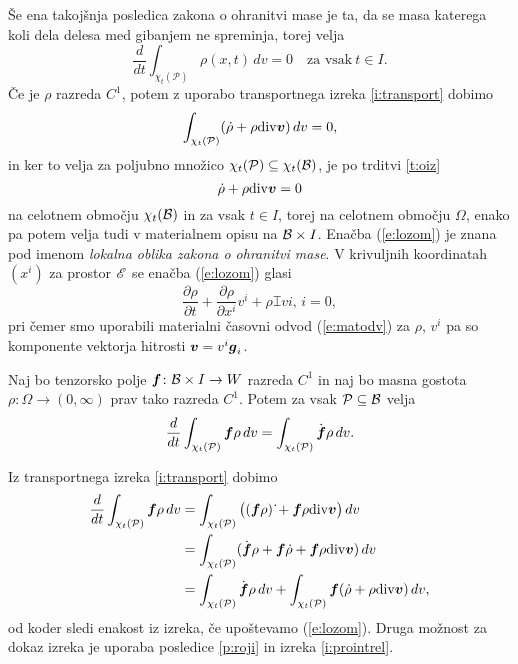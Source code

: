 Še ena takojšnja posledica zakona o ohranitvi mase je ta, da se masa katerega koli
dela delesa med gibanjem ne spreminja, torej velja
\[ \frac{d}{dt}\int_{\chi_t(\mathcal{P})}\rho(x,t)\,dv = 0\quad\textrm{za vsak}\ t\in I. \]
Če je $\rho$ razreda $C^1$, potem z uporabo transportnega izreka \ref{i:transport}
dobimo
\[ \int_{\chi_t(\mathcal{P})}(\dot{\rho}+\rho\mathrm{div}\boldsymbol v)\,dv=0, \]
in ker to velja za poljubno množico $\chi_t(\mathcal{P})\subseteq\chi_t(\mathcal B)$, je po trditvi \ref{t:oiz}
\begin{equation} \label{e:lozom}
	\dot{\rho}+\rho\mathrm{div}\boldsymbol v=0
\end{equation}
na celotnem območju $\chi_t(\mathcal B)$ in za vsak $t\in I$, torej na celotnem območju $\Omega$,
enako pa potem velja tudi v materialnem opisu na $\mathcal B\times I$.
Enačba (\ref{e:lozom}) je znana pod imenom \emph{lokalna oblika zakona o ohranitvi mase}.
V krivuljnih koordinatah $(x^i)$ za prostor $\mathscr E$ se enačba (\ref{e:lozom}) glasi
\[
	\frac{\partial\rho}{\partial t}+\frac{\partial\rho}{\partial x^i}v^i+\rho\topbot{v}{i}{,\, i}=0,
\]
pri čemer smo uporabili materialni časovni odvod (\ref{e:matodv}) za $\rho$, $v^i$ pa so
komponente vektorja hitrosti $\boldsymbol v=v^i\boldsymbol g_i$.

\begin{izrek}
	Naj bo tenzorsko polje $\boldsymbol f\colon \mathcal B\times I\to W$ razreda $C^1$ in naj bo masna gostota
	$\rho\colon\Omega\to(0,\infty)$ prav tako razreda $C^1$.
	Potem za vsak $\mathcal{P}\subseteq\mathcal B$ velja
	\[
		\frac{d}{dt}\int_{\chi_t(\mathcal{P})}\boldsymbol f\rho\,dv=
		\int_{\chi_t(\mathcal{P})}\dot{\boldsymbol f}\rho\,dv.
	\]
\end{izrek}
\proof
	Iz transportnega izreka \ref{i:transport} dobimo
	\begin{align*}
		\frac{d}{dt}\int_{\chi_t(\mathcal{P})}\boldsymbol f\rho\,dv
		&= \int_{\chi_t(\mathcal{P})}\big((\boldsymbol f\rho)\,\dot{}+\boldsymbol f\rho\mathrm{div}\boldsymbol v\big)\,dv \\
		&= \int_{\chi_t(\mathcal{P})}(\dot{\boldsymbol f}\rho+\boldsymbol f\dot{\rho}+\boldsymbol f\rho\mathrm{div}\boldsymbol v)\,dv\\
		&= \int_{\chi_t(\mathcal{P})}\dot{\boldsymbol f}\rho\,dv+
		\int_{\chi_t(\mathcal{P})}\boldsymbol f(\dot{\rho}+\rho\mathrm{div}\boldsymbol v)\,dv,
	\end{align*}
	od koder sledi enakost iz izreka, če upoštevamo (\ref{e:lozom}).
\endproof
Druga možnost za dokaz izreka je uporaba posledice \ref{p:roji} in
izreka \ref{i:prointrel}.